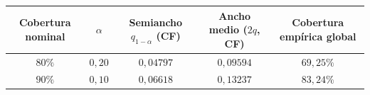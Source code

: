 \begin{tabular}{@{}ccccc@{}}
\toprule
Cobertura nominal & $\alpha$ & Semiancho $q_{1-\alpha}$ (CF) & Ancho medio ($2q$, CF) & Cobertura empírica global \\
\midrule
$80\%$ & $0{,}20$ & $0{,}04797$ & $0{,}09594$ & $69{,}25\%$ \\
$90\%$ & $0{,}10$ & $0{,}06618$ & $0{,}13237$ & $83{,}24\%$ \\
\bottomrule
\end{tabular}
